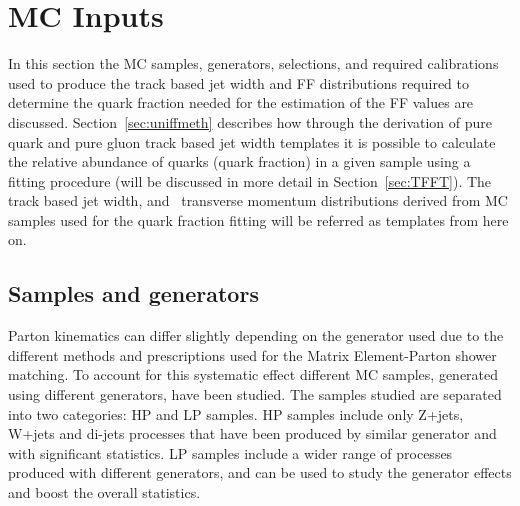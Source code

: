	\section{MC Inputs}
	\label{sec:mcinputs}
	In this section the \ac{MC} samples, generators, selections, and required calibrations used to produce the track based jet width and \ac{FF} distributions required to determine the quark fraction needed for the estimation of the \ac{FF} values are discussed.
	Section~\ref{sec:uniffmeth}  describes how through the derivation of pure quark and pure gluon track based jet width templates it is possible  to calculate the relative abundance of quarks (quark fraction) in a given sample using a fitting procedure (will be discussed in more detail in Section~\ref{sec:TFFT}). 
	The track based jet width, and \htau\ transverse momentum distributions derived from \ac{MC} samples used for the quark fraction fitting will be referred as templates from here on.
	
	\subsection{Samples and generators}
	\label{subsec:FTTFsample}
	Parton kinematics can differ slightly depending on the generator used due to the different methods and prescriptions used for the Matrix Element-Parton shower matching. To account for this systematic effect different MC samples, generated using different generators, have been studied. 
	The samples studied are separated into two categories: \ac{HP} and \ac{LP} samples. 
	\ac{HP} samples include only Z+jets, W+jets and di-jets processes that have been produced by similar generator and with significant statistics. \ac{LP} samples include a wider range of processes produced with different generators, and can be used to study the generator effects and boost  the overall statistics. 
	

